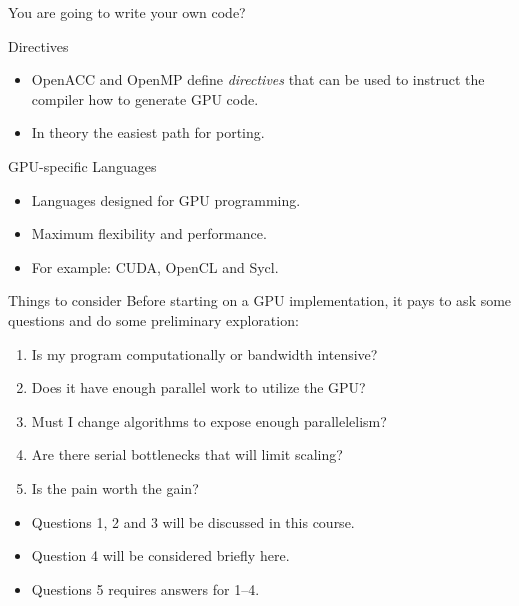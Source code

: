 \documentclass[aspectratio=43]{beamer}
\begin{document}
\begin{frame}[fragile]{You are going to write your own code?}

    \begin{info}{Directives}
        \begin{itemize}
            \item OpenACC and OpenMP define \emph{directives} that can be used to instruct the compiler how to generate GPU code.
            \item In theory the easiest path for porting.
        \end{itemize}
    \end{info}

    \begin{info}{GPU-specific Languages}
        \begin{itemize}
            \item Languages designed for GPU programming.
            \item Maximum flexibility and performance.
            \item For example: CUDA, OpenCL and Sycl.
        \end{itemize}
    \end{info}
\end{frame}

\begin{frame}[fragile]{Things to consider}
    Before starting on a GPU implementation, it pays to ask some questions and do some preliminary exploration:
    \begin{enumerate}
        \item Is my program computationally or bandwidth intensive?
        \item Does it have enough parallel work to utilize the GPU?
        \item Must I change algorithms to expose enough parallelelism?
        \item Are there serial bottlenecks that will limit scaling?
        \item Is the pain worth the gain?
    \end{enumerate}

    \begin{itemize}
        \item Questions 1, 2 and 3 will be discussed in this course.
        \item Question 4 will be considered briefly here.
        \item Questions 5 requires answers for 1--4.
    \end{itemize}
\end{frame}
\end{document}
